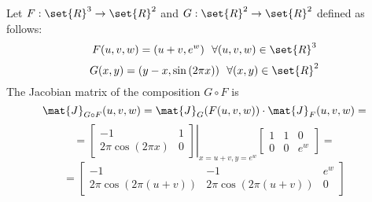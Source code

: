 \begin{example}
    Let $F: \set{R}^3 \rightarrow \set{R}^2$ and $G: \set{R}^2 \rightarrow \set{R}^2$ defined as follows:
    $$ F(u, v, w) = (u + v, e^w)\ \ \forall(u, v, w) \in \set{R}^3 $$
    $$ G(x, y) = (y - x, \sin{(2 \pi x)})\ \ \forall(x, y) \in \set{R}^2 $$
    The Jacobian matrix of the composition $G \circ F$ is
    $$ \mat{J}_{G \circ F}(u, v, w) = \mat{J}_G(F(u, v, w)) \cdot \mat{J}_F(u, v, w) = $$
    $$
        = \left.\begin{bmatrix}
            -1 & 1\\
            2\pi\cos{(2 \pi x)} & 0
        \end{bmatrix}\right|_{x = u + v, y = e^w}
        \begin{bmatrix}
            1 & 1 & 0\\
            0 & 0 & e^w
        \end{bmatrix} =
    $$
    $$
        = \begin{bmatrix}
            -1 & -1 & e^w\\
            2\pi\cos(2\pi(u+v)) & 2\pi\cos(2\pi(u+v)) & 0
        \end{bmatrix}
    $$
\end{example}